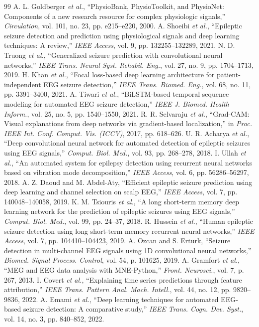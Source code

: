 \documentclass[conference]{IEEEtran}
\begin{document}
\begin{thebibliography}{99}
 A. L. Goldberger \textit{et al.}, ``PhysioBank, PhysioToolkit, and PhysioNet: Components of a new research resource for complex physiologic signals,'' \textit{Circulation}, vol. 101, no. 23, pp. e215--e220, 2000.
 A. Shoeibi \textit{et al.}, ``Epileptic seizure detection and prediction using physiological signals and deep learning techniques: A review,'' \textit{IEEE Access}, vol. 9, pp. 132255--132289, 2021.
 N. D. Truong \textit{et al.}, ``Generalized seizure prediction with convolutional neural networks,'' \textit{IEEE Trans. Neural Syst. Rehabil. Eng.}, vol. 27, no. 9, pp. 1704--1713, 2019.
 H. Khan \textit{et al.}, ``Focal loss-based deep learning architecture for patient-independent EEG seizure detection,'' \textit{IEEE Trans. Biomed. Eng.}, vol. 68, no. 11, pp. 3391--3400, 2021.
 A. Tiwari \textit{et al.}, ``BiLSTM-based temporal sequence modeling for automated EEG seizure detection,'' \textit{IEEE J. Biomed. Health Inform.}, vol. 25, no. 5, pp. 1540--1550, 2021.
 R. R. Selvaraju \textit{et al.}, ``Grad-CAM: Visual explanations from deep networks via gradient-based localization,'' in \textit{Proc. IEEE Int. Conf. Comput. Vis. (ICCV)}, 2017, pp. 618--626.
 U. R. Acharya \textit{et al.}, ``Deep convolutional neural network for automated detection of epileptic seizures using EEG signals,'' \textit{Comput. Biol. Med.}, vol. 93, pp. 268--278, 2018.
 I. Ullah \textit{et al.}, ``An automated system for epilepsy detection using recurrent neural networks based on vibration mode decomposition,'' \textit{IEEE Access}, vol. 6, pp. 56286--56297, 2018.
 A. Z. Daoud and M. Abdel-Aty, ``Efficient epileptic seizure prediction using deep learning and channel selection on scalp EEG,'' \textit{IEEE Access}, vol. 7, pp. 140048--140058, 2019.
 K. M. Tsiouris \textit{et al.}, ``A long short-term memory deep learning network for the prediction of epileptic seizures using EEG signals,'' \textit{Comput. Biol. Med.}, vol. 99, pp. 24--37, 2018.
 R. Hussein \textit{et al.}, ``Human epileptic seizure detection using long short-term memory recurrent neural networks,'' \textit{IEEE Access}, vol. 7, pp. 104410--104423, 2019.
 A. Ozcan and S. Erturk, ``Seizure detection in multi-channel EEG signals using 1D convolutional neural networks,'' \textit{Biomed. Signal Process. Control}, vol. 54, p. 101625, 2019.
 A. Gramfort \textit{et al.}, ``MEG and EEG data analysis with MNE-Python,'' \textit{Front. Neurosci.}, vol. 7, p. 267, 2013.
 I. Covert \textit{et al.}, ``Explaining time series predictions through feature attribution,'' \textit{IEEE Trans. Pattern Anal. Mach. Intell.}, vol. 44, no. 12, pp. 9820--9836, 2022.
 A. Emami \textit{et al.}, ``Deep learning techniques for automated EEG-based seizure detection: A comparative study,'' \textit{IEEE Trans. Cogn. Dev. Syst.}, vol. 14, no. 3, pp. 840--852, 2022.
\end{thebibliography}
\end{document}
